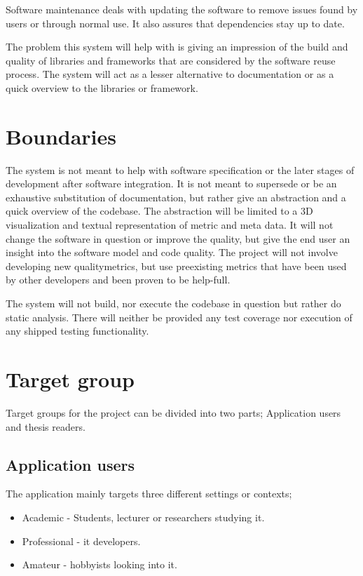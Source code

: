 Software maintenance deals with updating the software to remove issues found by users or through normal use. It also assures that dependencies stay up to date.

The problem this system will help with is giving an impression of the build and quality of libraries and frameworks that are considered by the software reuse process. The system will act as a lesser alternative to documentation or as a quick overview to the libraries or framework.

\section{Boundaries}
The system is not meant to help with software specification or the later stages of development after software integration. It is not meant to supersede or be an exhaustive substitution of documentation, but rather give an abstraction and a quick overview of the codebase. The abstraction will be limited to a 3D visualization and textual representation of metric and meta data. It will not change the software in question or improve the quality, but give the end user an insight into the software model and code quality. 
The project will not involve developing new \glspl{qualitymetric}, but use preexisting metrics that have been used by other developers and been proven to be help-full.

The system will not build, nor execute the codebase in question but rather do static analysis. There will neither be provided any test coverage nor execution of any shipped testing functionality.

\section{Target group}
Target groups for the project can be divided into two parts; Application users and thesis readers.

\subsection{Application users}
The application mainly targets three different settings or contexts;
\begin{itemize}
    \item Academic - Students, lecturer or researchers studying \gls{it}.
    \item Professional - \gls{it} developers.
    \item Amateur - hobbyists looking into \gls{it}.
\end{itemize}

